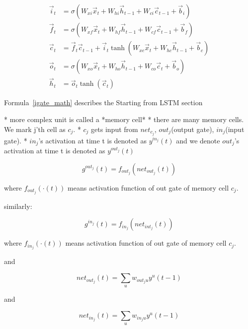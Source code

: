 \documentclass[officiallayout]{tktla}
\newcommand{\wtmat}[2]{W_{#1 #2}}
\newcommand{\igate}{i}
\newcommand{\fgate}{f}
\newcommand{\ogate}{o}
\newcommand{\state}{c}
\begin{document}
\begin{align}
\vec{\igate}_t &= \sigma\left(\wtmat{x}{\igate} \vec{x}_t + \wtmat{h}{\igate} \vec{h}_{t-1} + \wtmat{\state}{\igate} \vec{\state}_{t-1}  + \vec{b}_\igate\right) \label{igate_math}\\
\vec{\fgate}_t &= \sigma\left(\wtmat{x}{\fgate} \vec{x}_t + \wtmat{h}{\fgate} \vec{h}_{t-1} + \wtmat{\state}{\fgate} \vec{\state}_{t-1} + \vec{b}_\fgate \right) \label{fgate_math}\\
\vec{\state}_t &= \vec{\fgate}_t \vec{\state}_{t-1} + \vec{\igate}_t \tanh \left(\wtmat{x}{\state} \vec{x}_t + \wtmat{h}{\state} \vec{h}_{t-1} + \vec{b}_\state\right) \label{cell}\\
\vec{\ogate}_t &= \sigma\left(\wtmat{x}{\ogate} \vec{x}_t + \wtmat{h}{\ogate} \vec{h}_{t-1} + \wtmat{\state}{\ogate} \vec{\state}_{t} + \vec{b}_\ogate\right)\label{ogate_math}\\
\vec{h}_t &= \vec{\ogate}_t \tanh(\vec{\state}_t) \label{output_math}
\end{align}

Formula~\ref{igate_math} describes the
Starting from LSTM section

* more complex unit is called a *memory cell*
* there are many memory cells. We mark j'th cell as $c_j$.
* $c_j$ gets input from $net_{c_j}$, $out_j$(output gate), $in_j$(input gate).
* $in_j$'s activation at time t is denoted as $y^{in_j}(t)$ and we denote $out_j$'s activation at time t is denoted as $y^{out_j}(t)$

\begin{equation}
g^{out_j}(t) = f_{out_j}(net_{out_j}(t))
\end{equation}


where $f_{out_j}(\cdot (t))$ means activation function of out gate of memory cell $c_j$.

similarly:


\begin{equation}
g^{in_j}(t) = f_{in_j}(net_{int_j}(t))
\end{equation}


where $f_{in_j}(\cdot (t))$ means activation function of out gate of memory cell $c_j$.

and


\begin{equation}
net_{out_j}(t) = \sum_u w_{out_ju}y^u(t-1) \label{eq_netout}
\end{equation}


and


\begin{equation}
net_{in_j}(t) = \sum_u w_{in_ju}y^u(t-1) \label{eq_netin}
\end{equation}
\end{document}
